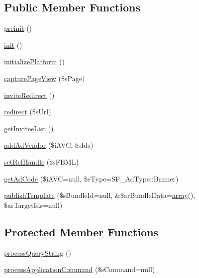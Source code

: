 \subsection*{Public Member Functions}
\begin{DoxyCompactItemize}
\item 
\hyperlink{classCSFBaseApplication_a2dc262e99b1c246b56f27626bfe699ff}{preinit} ()
\item 
\hyperlink{classCSFBaseApplication_a4be4055f3361d4800e16bc2e2e38cda6}{init} ()
\item 
\hyperlink{classCSFBaseApplication_a96b0f4bab679378904506e1a106c4e60}{initializePlatform} ()
\item 
\hyperlink{classCSFBaseApplication_a71fa3ba915a284747b787ab0d94869ce}{capturePageView} (\$sPage)
\item 
\hyperlink{classCSFBaseApplication_a6deb2041e7ee4cbb3511c0f5a7ea8a03}{inviteRedirect} ()
\item 
\hyperlink{classCSFBaseApplication_a83d6db3f4e5f36ddd8adad2f53133e76}{redirect} (\$sUrl)
\item 
\hyperlink{classCSFBaseApplication_acf7865241ab5ac45a0f04674efe51d1a}{getInviteeList} ()
\item 
\hyperlink{classCSFBaseApplication_af12c69561c23be5e6fc7e4e0a2808fbb}{addAdVendor} (\$iAVC, \$sIds)
\item 
\hyperlink{classCSFBaseApplication_a3978cc0d9152ece4cd315601a95a38bd}{setRefHandle} (\$sFBML)
\item 
\hyperlink{classCSFBaseApplication_a99e97980251298d31efe3451470e8df5}{getAdCode} (\$iAVC=null, \$eType=SF\_\-AdType::Banner)
\item 
\hyperlink{classCSFBaseApplication_ac409888924f803214fbd2df44327242b}{publishTemplate} (\$sBundleId=null, \&\$arBundleData=\hyperlink{list_8php_aa3205d038c7f8feb5c9f01ac4dfadc88}{array}(), \$arTargetIds=null)
\end{DoxyCompactItemize}
\subsection*{Protected Member Functions}
\begin{DoxyCompactItemize}
\item 
\hyperlink{classCSFBaseApplication_aa40909289ffd00ccc071d938f586fc47}{processQueryString} ()
\item 
\hyperlink{classCSFBaseApplication_aed904ee937df5c26c42b9995d2e3a69b}{processApplicationCommand} (\$sCommand=null)
\end{DoxyCompactItemize}


